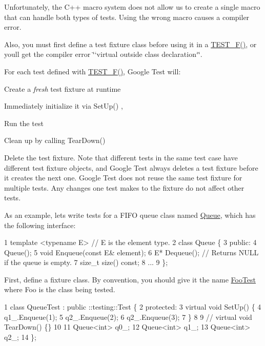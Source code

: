 Unfortunately, the C++ macro system does not allow us to create a single macro that can handle both types of tests. Using the wrong macro causes a compiler error.

Also, you must first define a test fixture class before using it in a {\ttfamily \hyperlink{gtest_8h_a0ee66d464d1a06c20c1929cae09d8758}{T\+E\+S\+T\+\_\+\+F()}}, or you\textquotesingle{}ll get the compiler error \char`\"{}`virtual outside class
declaration`\char`\"{}.

For each test defined with {\ttfamily \hyperlink{gtest_8h_a0ee66d464d1a06c20c1929cae09d8758}{T\+E\+S\+T\+\_\+\+F()}}, Google Test will\+:
\begin{DoxyEnumerate}
\item Create a {\itshape fresh} test fixture at runtime
\end{DoxyEnumerate}
\begin{DoxyEnumerate}
\item Immediately initialize it via {\ttfamily Set\+Up()} ,
\end{DoxyEnumerate}
\begin{DoxyEnumerate}
\item Run the test
\end{DoxyEnumerate}
\begin{DoxyEnumerate}
\item Clean up by calling {\ttfamily Tear\+Down()}
\end{DoxyEnumerate}
\begin{DoxyEnumerate}
\item Delete the test fixture. Note that different tests in the same test case have different test fixture objects, and Google Test always deletes a test fixture before it creates the next one. Google Test does not reuse the same test fixture for multiple tests. Any changes one test makes to the fixture do not affect other tests.
\end{DoxyEnumerate}

As an example, let\textquotesingle{}s write tests for a F\+I\+FO queue class named {\ttfamily \hyperlink{classQueue}{Queue}}, which has the following interface\+: 
\begin{DoxyCode}
1 template <typename E> // E is the element type.
2 class Queue \{
3  public:
4   Queue();
5   void Enqueue(const E& element);
6   E* Dequeue(); // Returns NULL if the queue is empty.
7   size\_t size() const;
8   ...
9 \};
\end{DoxyCode}


First, define a fixture class. By convention, you should give it the name {\ttfamily \hyperlink{classFooTest}{Foo\+Test}} where {\ttfamily Foo} is the class being tested. 
\begin{DoxyCode}
1 class QueueTest : public ::testing::Test \{
2  protected:
3   virtual void SetUp() \{
4     q1\_.Enqueue(1);
5     q2\_.Enqueue(2);
6     q2\_.Enqueue(3);
7   \}
8 
9   // virtual void TearDown() \{\}
10 
11   Queue<int> q0\_;
12   Queue<int> q1\_;
13   Queue<int> q2\_;
14 \};
\end{DoxyCode}


